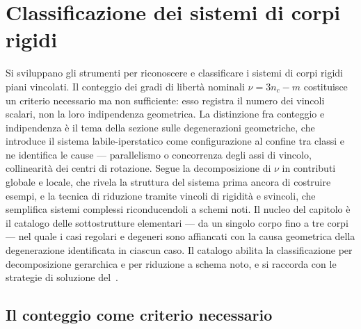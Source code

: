 \graphicspath{{Parti/P03-Meccanica_SR/C07-Classificazione_SCR/Figure/}}
\chapter{Classificazione dei sistemi di corpi rigidi}\label{cap:classificazione_SCR}

\begin{sommario}
	Si sviluppano gli strumenti per riconoscere e classificare 
	i sistemi di corpi rigidi piani vincolati.
	Il conteggio dei gradi di libertà nominali $\nu = 3n_c - m$ 
	costituisce un criterio necessario ma non sufficiente: 
	esso registra il numero dei vincoli scalari, non la loro 
	indipendenza geometrica.
	La distinzione fra conteggio e indipendenza è il tema della 
	sezione sulle degenerazioni geometriche, che introduce il 
	sistema labile-iperstatico come configurazione al confine 
	tra classi e ne identifica le cause --- parallelismo o 
	concorrenza degli assi di vincolo, collinearità dei centri 
	di rotazione.
	Segue la decomposizione di $\nu$ in contributi globale 
	e locale, che rivela la struttura del sistema prima ancora 
	di costruire esempi, e la tecnica di riduzione tramite vincoli di rigidità e svincoli,
	che semplifica sistemi complessi 
	riconducendoli a schemi noti.
	Il nucleo del capitolo è il catalogo delle sottostrutture 
	elementari --- da un singolo corpo fino a tre corpi --- 
	nel quale i casi regolari e degeneri sono affiancati 
	con la causa geometrica della degenerazione identificata 
	in ciascun caso. Il catalogo abilita la classificazione 
	per decomposizione gerarchica e per riduzione a schema 
	noto, e si raccorda con le strategie di soluzione 
	del~.
\end{sommario}



\section{Il conteggio come criterio necessario}
\label{sec:conteggio_necessario}

